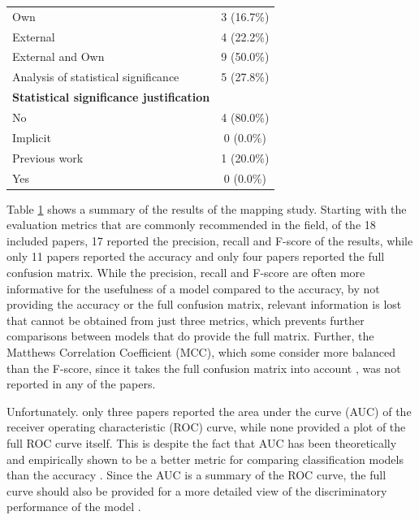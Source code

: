 \documentclass[a4paper]{article}
\begin{document}
\begin{table}[H]
\begin{tabularx}{0.7\textwidth}{|X|c|}
		\hspace{3mm} Own & 3 (16.7\%) \\
		\hspace{3mm} External & 4 (22.2\%)\\
		\hspace{3mm} External and Own & 9 (50.0\%) \\
		Analysis of statistical significance & 5 (27.8\%) \\
		\textbf{Statistical significance justification}&\\
		\hspace{3mm} No & 4 (80.0\%)  \\
		\hspace{3mm} Implicit & 0 (0.0\%) \\
		\hspace{3mm} Previous work & 1 (20.0\%) \\
		\hspace{3mm} Yes & 0 (0.0\%)  \\
		\hline
	\end{tabularx}
	\label{table:mapping_results}
\end{table}

Table \ref{table:mapping_results} shows a summary of the results of the mapping study. Starting with the evaluation metrics that are commonly recommended in the field, of the 18 included papers, 17 reported the precision, recall and F-score of the results, while only 11 papers reported the accuracy and only four papers reported the full confusion matrix. While the precision, recall and F-score are often more informative for the usefulness of a model compared to the accuracy, by not providing the accuracy or the full confusion matrix, relevant information is lost that cannot be obtained from just three metrics, which prevents further comparisons between models that do provide the full matrix. Further, the  Matthews Correlation Coefficient (MCC), which some consider more balanced than the F-score, since it takes the full confusion matrix into account \cite{Chicco2020}, was not reported in any of the papers.

Unfortunately. only three papers reported the area under the curve (AUC) of the receiver operating characteristic (ROC) curve, while none provided a plot of the full ROC curve itself. This is despite the fact that AUC has been theoretically and empirically shown to be a better metric for comparing classification models than the accuracy \cite{huang2005auc,ling2003auc}. Since the AUC is a summary of the ROC curve, the full curve should also be provided for a more detailed view of the discriminatory performance of the model \cite{Nahm2022roc}.
\end{document}
